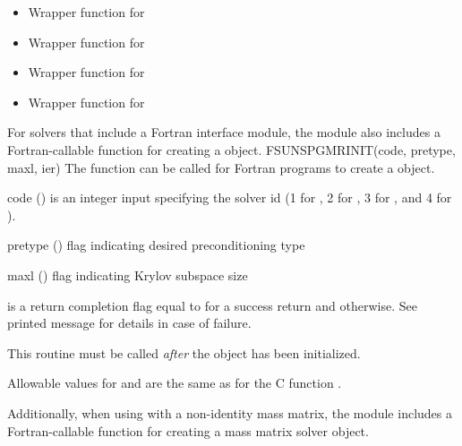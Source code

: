 \begin{itemize}

\item {}

  Wrapper function for 

\item {}

  Wrapper function for 

\item {}

  Wrapper function for 

\item {}

  Wrapper function for 

\end{itemize}
For solvers that include a Fortran interface module, the
{\sunlinsolspgmr} module also includes a Fortran-callable function
for creating a  object.
{
  FSUNSPGMRINIT(code, pretype, maxl, ier)
}
{
  The function  can be called for Fortran programs
  to create a {\sunlinsolspgmr} object.
}
{
  \begin{args}[pretype]
  \item[code] ()
    is an integer input specifying the solver id (1 for {\cvode}, 2
    for {\ida}, 3 for {\kinsol}, and 4 for {\arkode}).
  \item[pretype] ()
    flag indicating desired preconditioning type
  \item[maxl] ()
    flag indicating Krylov subspace size
  \end{args}
}
{
   is a return completion flag equal to  for a success
  return and  otherwise. See printed message for details in case
  of failure.
}
{
  This routine must be called \emph{after} the {\nvector} object has
  been initialized.

  Allowable values for  and  are the same as for
  the C function . 
}
Additionally, when using
{\arkode} with a non-identity mass matrix, the {\sunlinsolspgmr} module
includes a Fortran-callable function for creating a
 mass matrix solver object.
